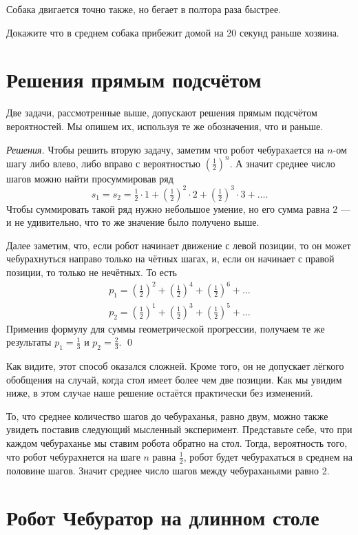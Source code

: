 \documentclass{article}
\begin{document}
Собака двигается точно также, но бегает в полтора раза быстрее.

Докажите что в среднем собака прибежит домой на 20 секунд раньше хозяина.

\section{Решения прямым подсчётом}

Две задачи, рассмотренные выше, допускают решения прямым подсчётом вероятностей. 
Мы опишем их, используя те же обозначения, что и раньше.

\medskip
\noindent\textit{Решения.}
Чтобы решить вторую задачу, 
заметим что робот чебурахается на $n$-ом шагу либо влево, либо вправо с вероятностью $(\tfrac12)^n$.
А значит среднее число шагов можно найти просуммировав ряд
\[s_1=s_2=\tfrac12\cdot1+(\tfrac12)^2\cdot 2+(\tfrac12)^3\cdot 3+\dots.\]
Чтобы суммировать такой ряд нужно небольшое умение, 
но его сумма равна $2$ --- и не удивительно, что то же значение было получено выше.

Далее заметим, что, если робот начинает движение с левой позиции, 
то он может чебурахнуться направо только на чётных шагах, 
и, если он начинает с правой позиции, то только не нечётных.
То есть
\begin{align*}
p_1=(\tfrac12)^2+(\tfrac12)^4+(\tfrac12)^6+\dots
\\
p_2=(\tfrac12)^1+(\tfrac12)^3+(\tfrac12)^5+\dots
\end{align*}
Применив формулу для суммы геометрической прогрессии, получаем те же результаты $p_1=\tfrac13$ и $p_2=\tfrac23$.
\qed
\medskip

Как видите, этот способ оказался сложней.
Кроме того, он не допускает лёгкого обобщения на случай, когда стол имеет более чем две позиции.
Как мы увидим ниже, 
в этом случае наше решение остаётся практически без изменений.

То, что среднее количество шагов до чебураханья,
равно двум, можно также увидеть поставив следующий мысленный эксперимент.
Представьте себе, что при каждом чебураханье 
мы ставим робота обратно на стол.
Тогда, вероятность того, что робот чебурахнется на шаге $n$
равна $\tfrac12$, робот будет чебурахаться в среднем на половине шагов.
Значит среднее число шагов между чебураханьями равно 2.


\section{Робот Чебуратор на длинном столе} 
\end{document}
